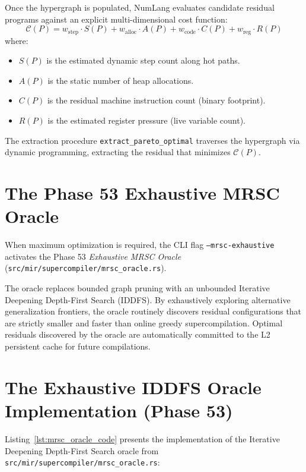 Once the hypergraph is populated, NumLang evaluates candidate residual programs against an explicit multi-dimensional cost function:
\begin{equation}
\mathcal{C}(P) = w_{\text{step}} \cdot S(P) + w_{\text{alloc}} \cdot A(P) + w_{\text{code}} \cdot C(P) + w_{\text{reg}} \cdot R(P)
\end{equation}
where:
\begin{itemize}
    \item $S(P)$ is the estimated dynamic step count along hot paths.
    \item $A(P)$ is the static number of heap allocations.
    \item $C(P)$ is the residual machine instruction count (binary footprint).
    \item $R(P)$ is the estimated register pressure (live variable count).
\end{itemize}

The extraction procedure \texttt{extract\_pareto\_optimal} traverses the hypergraph via dynamic programming, extracting the residual that minimizes $\mathcal{C}(P)$.

\section{The Phase 53 Exhaustive MRSC Oracle}
\label{sec:mrsc:oracle}

When maximum optimization is required, the CLI flag \texttt{--mrsc-exhaustive} activates the Phase 53 \emph{Exhaustive MRSC Oracle} (\texttt{src/mir/supercompiler/mrsc\_oracle.rs}). 

The oracle replaces bounded graph pruning with an unbounded Iterative Deepening Depth-First Search (IDDFS). By exhaustively exploring alternative generalization frontiers, the oracle routinely discovers residual configurations that are strictly smaller and faster than online greedy supercompilation. Optimal residuals discovered by the oracle are automatically committed to the L2 persistent cache for future compilations.

\section{The Exhaustive IDDFS Oracle Implementation (Phase 53)}
\label{sec:mrsc:oracle_code}

Listing~\ref{lst:mrsc_oracle_code} presents the implementation of the Iterative Deepening Depth-First Search oracle from \texttt{src/mir/supercompiler/mrsc\_oracle.rs}:

